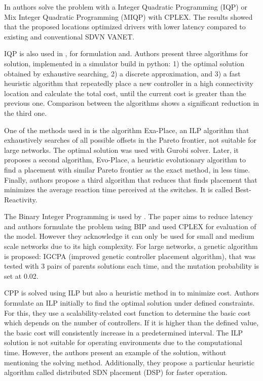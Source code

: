 \documentclass{IEEEtran}
\begin{document}
In \cite{SuMa18} authors solve the problem with a Integer Quadratic Programming (IQP) or Mix Integer Quadratic Programming (MIQP) with CPLEX. The results showed that the proposed locations optimized drivers with lower latency compared to existing and conventional SDVN VANET.





IQP is also used in \cite{SuHa17}, for formulation and. Authors present three algorithms for solution, implemented in a simulator build in python: 1) the optimal solution obtained by exhaustive searching, 2) a discrete approximation, and 3) a fast heuristic algorithm that repeatedly place a new controller in a high connectivity location and calculate the total cost, until the current cost is greater than the previous one. Comparison between the algorithms shows a significant reduction in the third one. 

One of the methods used in \cite{ZhGi17} is the algorithm Exa-Place, an ILP algorithm that exhaustively searches of all possible offsets in the Pareto frontier, not suitable for large networks. The optimal solution was used with Gurobi solver. Later, it proposes a second algorithm, Evo-Place, a heuristic evolutionary algorithm to find a placement with similar Pareto frontier as the exact method, in less time. Finally, authors propose a third algorithm that reduces that finds placement that minimizes the average reaction time perceived at the switches. It is called Best-Reactivity.

The Binary Integer Programming is used by \cite{HuLu17}. The paper aims to reduce latency and authors formulate the problem using BIP and used CPLEX for evaluation of the model. However they acknowledge it can only be used for small and medium scale networks due to its high complexity. For large networks, a genetic algorithm is proposed: IGCPA (improved
genetic controller placement algorithm), that was tested with 3 pairs of parents solutions
each time, and the mutation probability is set at 0.02.


CPP is solved using ILP but also a heuristic method in \cite{ZhWu17} to minimize cost. Authors formulate an ILP initially to find the optimal solution under defined constraints. For this, they use a scalability‐related cost function to determine the basic cost which depends on the number of controllers. If it is higher than the defined value, the basic cost will consistently increase in a predetermined interval. The ILP solution is not suitable for operating environments due to the computational time. However, the authors present an example of the solution, without mentioning the solving method. Additionally, they propose a particular heuristic algorithm called distributed SDN placement (DSP) for faster operation. 
\end{document}
